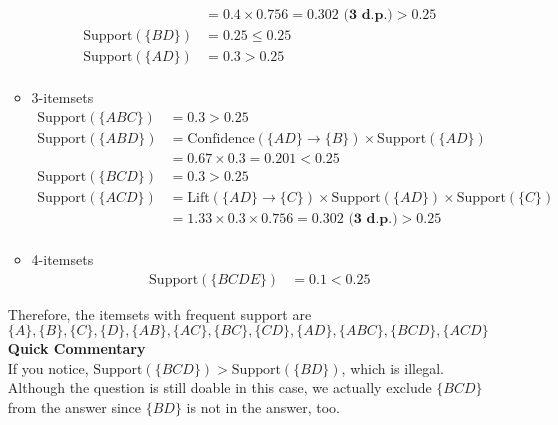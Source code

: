 \documentclass{article}
\begin{document}
\begin{enumerate}
\begin{itemize}
\begin{align*}
            &=0.4\times0.756 =0.302\textbf{ (3 d.p.)} > 0.25\\
            \text{Support}(\{BD\})&=0.25\le0.25\\
            \text{Support}(\{AD\})&=0.3>0.25\\
        \end{align*}
        \item 3-itemsets
        \begin{align*}
            \text{Support}(\{ABC\})&=0.3>0.25\\
            \text{Support}(\{ABD\})&=\text{Confidence}(\{AD\}\rightarrow\{B\})\times\text{Support}(\{AD\})\\
            &=0.67\times0.3 =0.201 < 0.25\\
            \text{Support}(\{BCD\})&=0.3>0.25\\
            \text{Support}(\{ACD\})&=\text{Lift}(\{AD\}\rightarrow\{C\})\times\text{Support}(\{AD\})\times\text{Support}(\{C\})\\
            &=1.33\times0.3\times0.756 =0.302\textbf{ (3 d.p.)} > 0.25\\
        \end{align*}
        \item 4-itemsets
        \begin{align*}
            \text{Support}(\{BCDE\})&=0.1<0.25
        \end{align*}
    \end{itemize}
    Therefore, the itemsets with frequent support are
    \[\{A\},\{B\},\{C\},\{D\},\{AB\},\{AC\},\{BC\},\{CD\},\{AD\},\{ABC\},\{BCD\},\{ACD\}\]
    \textbf{Quick Commentary}\\
    If you notice, $\text{Support}(\{BCD\})>\text{Support}(\{BD\})$, which is illegal. Although the question is still doable in this case, we actually exclude $\{BCD\}$ from the answer since $\{BD\}$ is not in the answer, too.
    

\end{enumerate}
\end{document}
